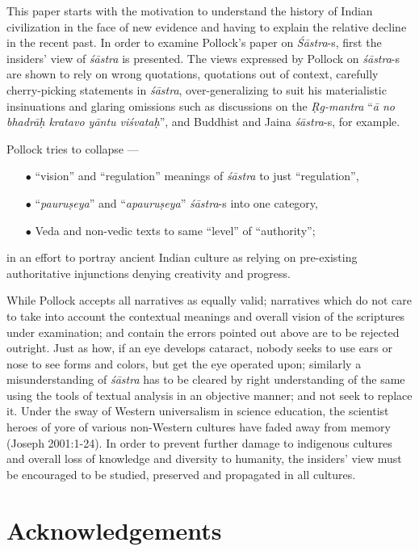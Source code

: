 This paper starts with the motivation to understand the history of Indian civilization in the face of new evidence and having to explain the relative decline in the recent past. In order to examine Pollock's paper on {\sl Śāstra}-s, ﬁrst the insiders' view of {\sl śāstra} is presented. The views expressed by Pollock on {\sl śāstra}-s are shown to rely on wrong quotations, quotations out of context, carefully cherry-picking statements in {\sl śāstra}, over-generalizing to suit his materialistic insinuations and glaring omissions such as discussions on the {\sl Ṛg-mantra} ``{\sl ā no bhadrāḥ kratavo yāntu viśvataḥ}'', and Buddhist and Jaina {\sl śāstra}-s, for example.

Pollock tries to collapse ---
\begin{itemize}
\item[$\bullet$]  ``vision'' and ``regulation'' meanings of {\sl śāstra} to just ``regulation'',

\item[$\bullet$] ``{\sl pauruṣeya}'' and ``{\sl apauruṣeya}'' {\sl śāstra}-s into one category,

\item[$\bullet$] Veda and non-vedic texts to same ``level'' of ``authority'';
\end{itemize}
in an effort to portray ancient Indian culture as relying on pre-existing authoritative injunctions denying creativity and progress.

While Pollock accepts all narratives as equally valid; narratives which do not care to take into account the contextual meanings and overall vision of the scriptures under examination; and contain the errors pointed out above are to be rejected outright. Just as how, if an eye develops cataract, nobody seeks to use ears or nose to see forms and colors, but get the eye operated upon; similarly a misunderstanding of {\sl śāstra} has to be cleared by right understanding of the same using the tools of textual analysis in an objective manner; and not seek to replace it. Under the sway of Western universalism in science education, the scientist heroes of yore of various non-Western cultures have faded away from memory (Joseph 2001:1-24). In order to prevent further damage to indigenous cultures and overall loss of knowledge and diversity to humanity, the insiders' view must be encouraged to be studied, preserved and propagated in all cultures. 

\newpage

\section*{Acknowledgements}

